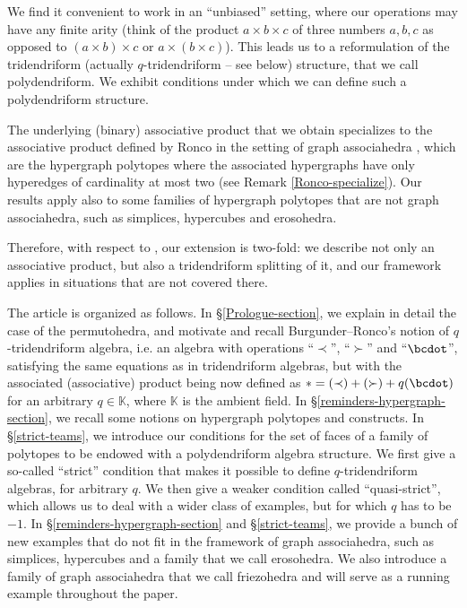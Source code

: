We find it convenient to work in an  ``unbiased'' setting, where our operations may have any finite arity (think of the product $a\times b\times c$ of three numbers $a,b,c$ as opposed to $(a \times b)\times c$ or $a\times (b\times c)$). This leads us to a reformulation of the tridendriform  (actually $q$-tridendriform  -- see below) structure, that we call polydendriform.  We exhibit conditions under which we can define such a polydendriform structure.

The underlying (binary) associative product that we obtain specializes to the associative product defined by Ronco \cite{RoncoGTO} in the setting of graph associahedra \cite{CD-CCGA}, which are the hypergraph polytopes where the associated hypergraphs have only hyperedges of cardinality at most two (see Remark \ref{Ronco-specialize}). Our results apply also  to some families of hypergraph polytopes that are not graph associahedra, such as simplices, hypercubes and erosohedra.
 
 Therefore, with respect to  \cite{RoncoGTO}, our extension is two-fold:  we describe not only an associative product, but also a tridendriform splitting of it, and our framework applies in situations that are not covered there.

The article is organized as follows. 
In  \S\ref{Prologue-section}, we explain in detail the case of the permutohedra,
and motivate and recall Burgunder--Ronco's notion of $q$-tridendriform algebra, i.e.  an algebra with operations ``$\prec$'', ``$\succ$'' and ``$\bcdot$'',  satisfying the same equations as in tridendriform algebras, but with the associated (associative) product being now defined as $\ast = (\prec) + (\succ) + q( \bcdot)$  for an arbitrary $q \in \mathbb{K}$, where $\mathbb{K}$ is the ambient field.
In \S\ref{reminders-hypergraph-section}, we recall some notions on hypergraph polytopes and constructs.
In \S\ref{strict-teams}, we introduce our conditions for  the set of faces of a family of polytopes to be endowed with a polydendriform algebra structure. We first give a so-called ``strict'' condition  that makes it possible to define $q$-tridendriform algebras, for arbitrary $q$. We then give a weaker condition called ``quasi-strict'', which allows us to deal with a wider class of examples, but for which $q$ has to be $-1$.  In \S\ref{reminders-hypergraph-section} and \S\ref{strict-teams}, we provide a bunch of new examples that do not fit in the framework of graph associahedra, such as simplices, hypercubes and a family that we call erosohedra. We also introduce a family of graph associahedra that we call friezohedra and will serve as a running example throughout the paper.


